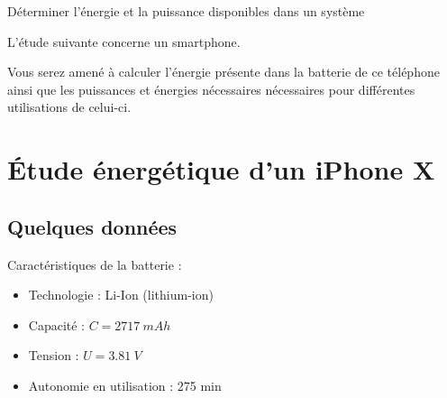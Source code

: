 \documentclass[10pt,fleqn]{article} %
\begin{document}

\begin{obj}
Déterminer l’énergie et la puissance disponibles dans un système

L’étude suivante concerne un smartphone. 

Vous serez amené à
 calculer l’énergie présente dans la batterie de ce téléphone ainsi que les puissances et énergies nécessaires
 nécessaires pour différentes utilisations de celui-ci.
 
\end{obj}
\section{Étude énergétique d'un iPhone X}
\subsection{Quelques données}
Caractéristiques de la batterie :
\begin{itemize}
 \item Technologie : Li-Ion (lithium-ion)
\item Capacité : $ C = \SI{2717}{mAh} $
\item Tension : $U=\SI{3.81}{V}$
\item Autonomie en utilisation : 275 min
\end{itemize}
\end{document}
